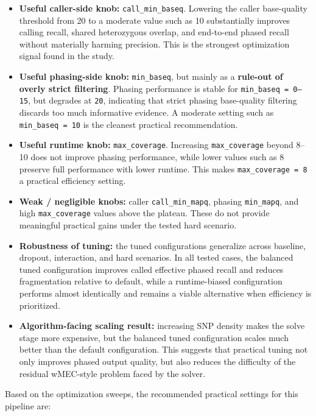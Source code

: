 \documentclass[
]{article}
\begin{document}
\begin{itemize}
\item
  \textbf{Useful caller-side knob:} \texttt{call\_min\_baseq}. Lowering
  the caller base-quality threshold from 20 to a moderate value such as
  10 substantially improves calling recall, shared heterozygous overlap,
  and end-to-end phased recall without materially harming precision.
  This is the strongest optimization signal found in the study.
\item
  \textbf{Useful phasing-side knob:} \texttt{min\_baseq}, but mainly as
  a \textbf{rule-out of overly strict filtering}. Phasing performance is
  stable for \texttt{min\_baseq\ =\ 0–15}, but degrades at \texttt{20},
  indicating that strict phasing base-quality filtering discards too
  much informative evidence. A moderate setting such as
  \texttt{min\_baseq\ =\ 10} is the cleanest practical recommendation.
\item
  \textbf{Useful runtime knob:} \texttt{max\_coverage}. Increasing
  \texttt{max\_coverage} beyond 8--10 does not improve phasing
  performance, while lower values such as 8 preserve full performance
  with lower runtime. This makes \texttt{max\_coverage\ =\ 8} a
  practical efficiency setting.
\item
  \textbf{Weak / negligible knobs:} caller \texttt{call\_min\_mapq},
  phasing \texttt{min\_mapq}, and high \texttt{max\_coverage} values
  above the plateau. These do not provide meaningful practical gains
  under the tested hard scenario.
\item
  \textbf{Robustness of tuning:} the tuned configurations generalize
  across baseline, dropout, interaction, and hard scenarios. In all
  tested cases, the balanced tuned configuration improves called
  effective phased recall and reduces fragmentation relative to default,
  while a runtime-biased configuration performs almost identically and
  remains a viable alternative when efficiency is prioritized.
\item
  \textbf{Algorithm-facing scaling result:} increasing SNP density makes
  the solve stage more expensive, but the balanced tuned configuration
  scales much better than the default configuration. This suggests that
  practical tuning not only improves phased output quality, but also
  reduces the difficulty of the residual wMEC-style problem faced by the
  solver.
\end{itemize}

Based on the optimization sweeps, the recommended practical settings for
this pipeline are:
\end{document}
